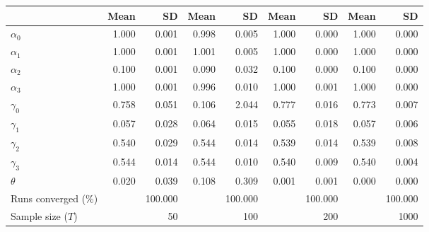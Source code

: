 
\begin{tabular}[t]{lrrrrrrrr}
\toprule
  & Mean & SD & Mean  & SD  & Mean   & SD   & Mean    & SD   \\
\midrule
$\alpha_{0}$ & 1.000 & 0.001 & 0.998 & 0.005 & 1.000 & 0.000 & 1.000 & 0.000\\
$\alpha_{1}$ & 1.000 & 0.001 & 1.001 & 0.005 & 1.000 & 0.000 & 1.000 & 0.000\\
$\alpha_{2}$ & 0.100 & 0.001 & 0.090 & 0.032 & 0.100 & 0.000 & 0.100 & 0.000\\
$\alpha_{3}$ & 1.000 & 0.001 & 0.996 & 0.010 & 1.000 & 0.001 & 1.000 & 0.000\\
$\gamma_{0}$ & 0.758 & 0.051 & 0.106 & 2.044 & 0.777 & 0.016 & 0.773 & 0.007\\
$\gamma_{1}$ & 0.057 & 0.028 & 0.064 & 0.015 & 0.055 & 0.018 & 0.057 & 0.006\\
$\gamma_{2}$ & 0.540 & 0.029 & 0.544 & 0.014 & 0.539 & 0.014 & 0.539 & 0.008\\
$\gamma_{3}$ & 0.544 & 0.014 & 0.544 & 0.010 & 0.540 & 0.009 & 0.540 & 0.004\\
$\theta$ & 0.020 & 0.039 & 0.108 & 0.309 & 0.001 & 0.001 & 0.000 & 0.000\\
Runs converged (\%) &  & 100.000 &  & 100.000 &  & 100.000 &  & 100.000\\
Sample size ($T$) &  & 50 &  & 100 &  & 200 &  & 1000\\
\bottomrule
\end{tabular}
